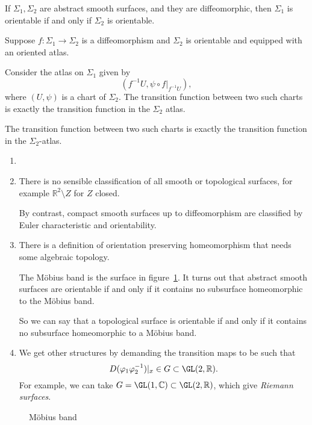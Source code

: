 \documentclass[12pt]{article}
\begin{document}
\begin{lemma}
	If $\Sigma_1, \Sigma_2$ are abstract smooth surfaces, and they are diffeomorphic, then $\Sigma_1$ is orientable if and only if $\Sigma_2$ is orientable.
\end{lemma}

\begin{proofbox}
	Suppose $f : \Sigma_1 \to \Sigma_2$ is a diffeomorphism and $\Sigma_2$ is orientable and equipped with an oriented atlas.

	Consider the atlas on $\Sigma_1$ given by
	\[
		(f^{-1}U, \psi \circ f|_{f^{-1}U})
	,\]
	where $(U, \psi)$ is a chart of $\Sigma_2$. The transition function between two such charts is exactly the transition function in the $\Sigma_2$ atlas.

	The transition function between two such charts is exactly the transition function in the $\Sigma_2$-atlas.
\end{proofbox}

\begin{remark}
	\begin{enumerate}[1.]
		\item[]
		\item There is no sensible classification of all smooth or topological surfaces, for example $\mathbb{R}^2 \setminus Z$ for $Z$ closed.

			By contrast, compact smooth surfaces up to diffeomorphism are classified by Euler characteristic and orientability.
		\item There is a definition of orientation preserving homeomorphism that needs some algebraic topology.

			The M\"{o}bius band is the surface in figure~\ref{fig:mobius_band}. It turns out that abstract smooth surfaces are orientable if and only if it contains no subsurface homeomorphic to the M\"{o}bius band.

			So we can say that a topological surface is orientable if and only if it contains no subsurface homeomorphic to a M\"{o}bius band.
		\item We get other structures by demanding the transition maps to be such that
			\[
			D(\varphi_1 \varphi_2^{-1})|_x \in G \subset \GL(2,\mathbb{R})
			.\]
			For example, we can take $G = \GL(1, \mathbb{C}) \subset \GL(2, \mathbb{R})$, which give \emph{Riemann surfaces}.
	\end{enumerate}
\end{remark}

\begin{figure}[h]
	\centering
	\caption{M\"{o}bius band}
	\label{fig:mobius_band}
\end{figure}
\end{document}
